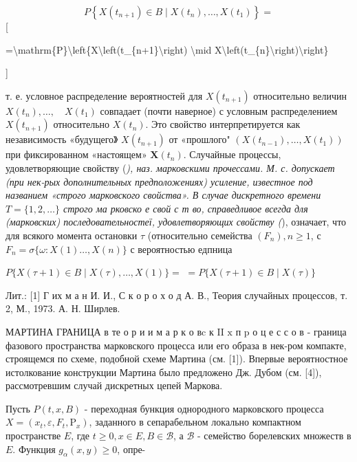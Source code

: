 \documentclass[10pt]{article}
\begin{document}
\[

P\left\{X\left(t_{n+1}\right) \in B \mid X\left(t_{n}\right), \ldots, X\left(t_{1}\right)\right\}=

\][



=\textbackslash mathrm\{P\}\textbackslash left\{X\textbackslash left(t\_\{n+1\}\textbackslash right) \textbackslash mid X\textbackslash left(t\_\{n\}\textbackslash right)\textbackslash right\}

]



т. е. условное распределение вероятностей для $X\left(t_{n+1}\right)$ относительно величин $X\left(t_{n}\right), \ldots, \quad X\left(t_{1}\right)$ совпадает (почти наверное) с условным распределением $X\left(t_{n+1}\right)$ относительно $X\left(t_{n}\right)$. Это свойство интерпретируется как независимость «будущего》 $X\left(t_{n+1}\right)$ от «прошлого" $\left(X\left(t_{n-1}\right), \ldots, X\left(t_{1}\right)\right)$ при фиксированном «настоящем» $\boldsymbol{X}\left(t_{n}\right)$. Случайные процессы, удовлетворяющие свойству (\textit{), наз. марковскими прочессами. М. с. допускает (при нек-рых дополнительных предположениях) усиление, известное под названием «строго марковского свойства». В случае дискретного времени $T=\{1,2, \ldots\}$ строго ма рковско е свой с т во, справедливое всегда для (марковских) последовательностеї, удовлетворяющих свойству (}), означает, что для всякого момента остановки $\tau$ (относительно семейства $\left(F_{n}\right), n \geqslant 1$, с $F_{n}=\sigma\{\omega: X(1) \ldots, X(n)\}$ с вероятностью едпница



$P\{X(\tau+1) \in B \mid X(\tau), \ldots, X(1)\}=$ $=P\{X(\tau+1) \in B \mid X(\tau)\}$



Лит.: [1] Г их м а н И. И., С к о р о х о д А. В., Теория случайных процессов, т. 2, М., 1973. А. Н. Ширлев.



МАРТИНА ГРАНИЦА в те о р и и м а р к о вc к II $\mathrm{x}$ п $\mathrm{p}$ о ц е с с о в - граница фазового пространства марковского процесса или его образа в нек-ром компакте, строящемся по схеме, подобной схеме Мартина (см. [1]). Впервые вероятностное истолкование конструкции Мартина было предложено Дж. Дубом (см. [4]), рассмотревшим случай дискретных цепей Маркова.



Пусть $P(t, x, B)$ - переходная бункция однородного марковского процесса $X=\left(x_{t}, \varepsilon, F_{t}, \mathrm{P}_{x}\right)$, заданного в сепарабельном локально компактном пространстве $E$, где $t \geqslant 0, x \in E, B \in \mathscr{B}$, а $\mathscr{B}$ - семейство борелевских множеств в $E$. Функция $g_{\alpha}(x, y) \geqslant 0$, опре-
\end{document}
